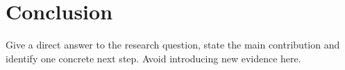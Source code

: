 \section{Conclusion}
Give a direct answer to the research question, state the main contribution and
identify one concrete next step. Avoid introducing new evidence here.
